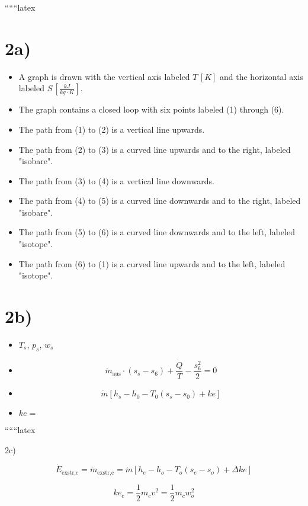 
``````latex


\section*{2a)}

\begin{itemize}
    \item A graph is drawn with the vertical axis labeled \( T \, [K] \) and the horizontal axis labeled \( S \, \left[ \frac{kJ}{kg \cdot K} \right] \).
    \item The graph contains a closed loop with six points labeled (1) through (6).
    \item The path from (1) to (2) is a vertical line upwards.
    \item The path from (2) to (3) is a curved line upwards and to the right, labeled "isobare".
    \item The path from (3) to (4) is a vertical line downwards.
    \item The path from (4) to (5) is a curved line downwards and to the right, labeled "isobare".
    \item The path from (5) to (6) is a curved line downwards and to the left, labeled "isotope".
    \item The path from (6) to (1) is a curved line upwards and to the left, labeled "isotope".
\end{itemize}

\section*{2b)}

\begin{itemize}
    \item \( T_s \), \( p_s \), \( w_s \)
    \item \[ \dot{m}_{\text{aus}} \cdot (s_s - s_6) + \frac{\dot{Q}}{T} - \frac{s_6^2}{2} = 0 \]
    \item \[ \dot{m} \left[ h_s - h_0 - T_0 (s_s - s_0) + ke \right] \]
    \item \( ke = \)
\end{itemize}

``````latex

2c)

\[
\dot{E}_{\text{exstr,c}} = \dot{m}_{\text{exstr,c}} = \dot{m} \left[ h_{e} - h_{o} - T_{o}(s_{e} - s_{o}) + \Delta ke \right]
\]

\[
ke_{c} = \frac{1}{2} m_{c} v^{2} = \frac{1}{2} m_{c} w_{o}^{2}
\]

